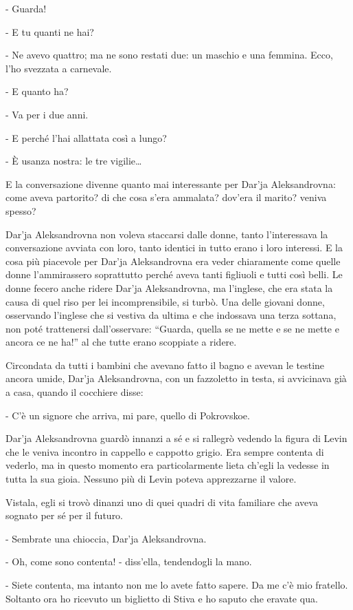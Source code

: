 - Guarda! 

- E tu quanti ne hai? 

- Ne avevo quattro; ma ne sono restati due: un maschio e una femmina. Ecco, l'ho svezzata a carnevale. 

- E quanto ha? 

- Va per i due anni. 

- E perché l'hai allattata così a lungo? 

- È usanza nostra: le tre vigilie\ldots{} 

E la conversazione divenne quanto mai interessante per Dar'ja Aleksandrovna: come aveva partorito? di che cosa s'era ammalata? dov'era il marito? veniva spesso? 

Dar'ja Aleksandrovna non voleva staccarsi dalle donne, tanto l'interessava la conversazione avviata con loro, tanto identici in tutto erano i loro interessi. E la cosa più piacevole per Dar'ja Aleksandrovna era veder chiaramente come quelle donne l'ammirassero soprattutto perché aveva tanti figliuoli e tutti così belli. Le donne fecero anche ridere Dar'ja Aleksandrovna, ma l'inglese, che era stata la causa di quel riso per lei incomprensibile, si turbò. Una delle giovani donne, osservando l'inglese che si vestiva da ultima e che indossava una terza sottana, non poté trattenersi dall'osservare: ``Guarda, quella se ne mette e se ne mette e ancora ce ne ha!'' al che tutte erano scoppiate a ridere. 

\label{ix-2} 

Circondata da tutti i bambini che avevano fatto il bagno e avevan le testine ancora umide, Dar'ja Aleksandrovna, con un fazzoletto in testa, si avvicinava già a casa, quando il cocchiere disse: 

- C'è un signore che arriva, mi pare, quello di Pokrovskoe. 

Dar'ja Aleksandrovna guardò innanzi a sé e si rallegrò vedendo la figura di Levin che le veniva incontro in cappello e cappotto grigio. Era sempre contenta di vederlo, ma in questo momento era particolarmente lieta ch'egli la vedesse in tutta la sua gioia. Nessuno più di Levin poteva apprezzarne il valore. 

Vistala, egli si trovò dinanzi uno di quei quadri di vita familiare che aveva sognato per sé per il futuro. 

- Sembrate una chioccia, Dar'ja Aleksandrovna. 

- Oh, come sono contenta! - diss'ella, tendendogli la mano. 

- Siete contenta, ma intanto non me lo avete fatto sapere. Da me c'è mio fratello. Soltanto ora ho ricevuto un biglietto di Stiva e ho saputo che eravate qua. 

